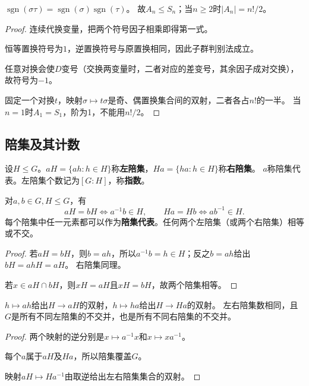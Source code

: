 \begin{proposition}
$\operatorname{sgn}(\sigma\tau)=\operatorname{sgn}(\sigma)\operatorname{sgn}(\tau)$。
故$A_n\leq S_n$；当$n\geq2$时$|A_n|=n!/2$。
\end{proposition}
\begin{proof}
连续代换变量，把两个符号因子相乘即得第一式。

恒等置换符号为$1$，逆置换符号与原置换相同，因此子群判别法成立。

任意对换会使$D$变号（交换两变量时，二者对应的差变号，其余因子成对交换），故符号为$-1$。

固定一个对换$t$，映射$\sigma\mapsto t\sigma$是奇、偶置换集合间的双射，二者各占$n!$的一半。
当$n=1$时$A_1=S_1$，阶为1，不能用$n!/2$。

\end{proof}

\subsection*{陪集及其计数}
\begin{definition}
设$H\leq G$。$aH=\{ah:h\in H\}$称\textbf{左陪集}，$Ha=\{ha:h\in H\}$称\textbf{右陪集}。
$a$称陪集代表。左陪集个数记为$[G:H]$，称\textbf{指数}。
\end{definition}

\begin{proposition}
对$a,b\in G,H\leqslant G$，有
\[
aH=bH\iff a^{-1}b\in H,
\qquad Ha=Hb\iff ab^{-1}\in H.
\]
每个陪集中任一元素都可以作为\textbf{陪集代表}。任何两个左陪集（或两个右陪集）相等或不交。
\end{proposition}
\begin{proof}
若$aH=bH$，则$b=ah$，所以$a^{-1}b=h\in H$；反之$b=ah$给出$bH=ahH=aH$。
右陪集同理。

若$x\in aH\cap bH$，则$xH=aH$且$xH=bH$，故两个陪集相等。
\end{proof}

\begin{proposition}
$h\mapsto ah$给出$H\to aH$的双射，$h\mapsto ha$给出$H\to Ha$的双射。
左右陪集数相同，且$G$是所有不同左陪集的不交并，也是所有不同右陪集的不交并。
\end{proposition}
\begin{proof}
两个映射的逆分别是$x\mapsto a^{-1}x$和$x\mapsto xa^{-1}$。

每个$a$属于$aH$及$Ha$，所以陪集覆盖$G$。

映射$aH\mapsto Ha^{-1}$由取逆给出左右陪集集合的双射。
\end{proof}

